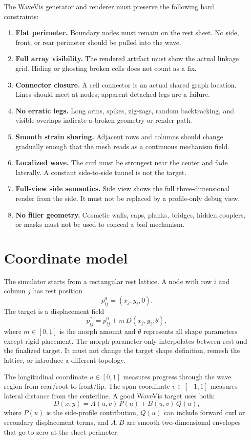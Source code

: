 \documentclass[12pt,letterpaper]{article}
\begin{document}
The WaveVis generator and renderer must preserve the following hard constraints:
\begin{enumerate}
  \item \textbf{Flat perimeter.} Boundary nodes must remain on the rest sheet. No side, front, or rear perimeter should be pulled into the wave.
  \item \textbf{Full array visibility.} The rendered artifact must show the actual linkage grid. Hiding or ghosting broken cells does not count as a fix.
  \item \textbf{Connector closure.} A cell connector is an actual shared graph location. Lines should meet at nodes; apparent detached legs are a failure.
  \item \textbf{No erratic legs.} Long arms, spikes, zig-zags, random backtracking, and visible overlaps indicate a broken geometry or render path.
  \item \textbf{Smooth strain sharing.} Adjacent rows and columns should change gradually enough that the mesh reads as a continuous mechanism field.
  \item \textbf{Localized wave.} The curl must be strongest near the center and fade laterally. A constant side-to-side tunnel is not the target.
  \item \textbf{Full-view side semantics.} Side view shows the full three-dimensional render from the side. It must not be replaced by a profile-only debug view.
  \item \textbf{No filler geometry.} Cosmetic walls, caps, planks, bridges, hidden couplers, or masks must not be used to conceal a bad mechanism.
\end{enumerate}

\section{Coordinate model}

The simulator starts from a rectangular rest lattice. A node with row \(i\) and column \(j\) has rest position
\[
  p_{ij}^{0} = (x_j, y_i, 0).
\]
The target is a displacement field
\[
  p_{ij}^{*} = p_{ij}^{0} + m\,D(x_j,y_i;\theta),
\]
where \(m\in[0,1]\) is the morph amount and \(\theta\) represents all shape parameters except rigid placement. The morph parameter only interpolates between rest and the finalized target. It must not change the target shape definition, remesh the lattice, or introduce a different topology.

The longitudinal coordinate \(u\in[0,1]\) measures progress through the wave region from rear/root to front/lip. The span coordinate \(v\in[-1,1]\) measures lateral distance from the centerline. A good WaveVis target uses both:
\[
  D(x,y) = A(u,v)\,P(u) + B(u,v)\,Q(u),
\]
where \(P(u)\) is the side-profile contribution, \(Q(u)\) can include forward curl or secondary displacement terms, and \(A,B\) are smooth two-dimensional envelopes that go to zero at the sheet perimeter.
\end{document}
